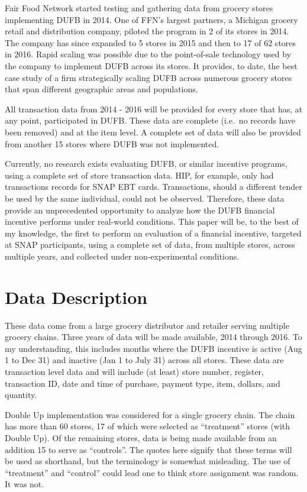 \documentclass[12pt,letterpaperpaper,]{book}
\begin{document}
Fair Food Network started testing and gathering data from grocery stores
implementing DUFB in 2014. One of FFN's largest partners, a Michigan
grocery retail and distribution company, piloted the program in 2 of its
stores in 2014. The company has since expanded to 5 stores in 2015 and
then to 17 of 62 stores in 2016. Rapid scaling was possible due to the
point-of-sale technology used by the company to implement DUFB across
its stores. It provides, to date, the best case study of a firm
strategically scaling DUFB across numerous grocery stores that span
different geographic areas and populations.

All transaction data from 2014 - 2016 will be provided for every store
that has, at any point, participated in DUFB. These data are complete
(i.e.~no records have been removed) and at the item level. A complete
set of data will also be provided from another 15 stores where DUFB was
not implemented.

Currently, no research exists evaluating DUFB, or similar incentive
programs, using a complete set of store transaction data. HIP, for
example, only had transactions records for SNAP EBT cards. Transactions,
should a different tender be used by the same individual, could not be
observed. Therefore, these data provide an unprecedented opportunity to
analyze how the DUFB financial incentive performs under real-world
conditions. This paper will be, to the best of my knowledge, the first
to perform an evaluation of a financial incentive, targeted at SNAP
participants, using a complete set of data, from multiple stores, across
multiple years, and collected under non-experimental conditions.

\hypertarget{data-1}{\section*{Data Description}\label{data-1}}

These data come from a large grocery distributor and retailer serving
multiple grocery chains. Three years of data will be made available,
2014 through 2016. To my understanding, this includes months where the
DUFB incentive is active (Aug 1 to Dec 31) and inactive (Jan 1 to July
31) across all stores. These data are transaction level data and will
include (at least) store number, register, transaction ID, date and time
of purchase, payment type, item, dollars, and quantity.

Double Up implementation was considered for a single grocery chain. The
chain has more than 60 stores, 17 of which were selected as
``treatment'' stores (with Double Up). Of the remaining stores, data is
being made available from an addition 15 to serve as ``controls''. The
quotes here signify that these terms will be used as shorthand, but the
terminology is somewhat misleading. The use of ``treatment'' and
``control'' could lead one to think store assignment was random. It was
not.
\end{document}
